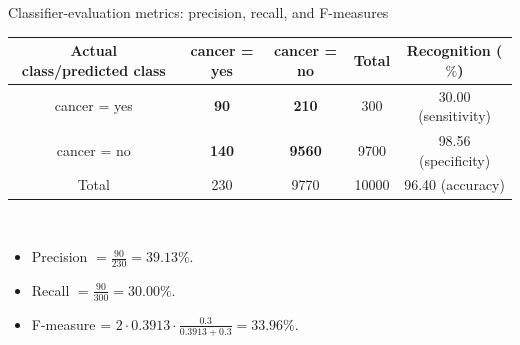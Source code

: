 \documentclass[aspectratio=169,t,table]{beamer}
\begin{document}
  {
    \begin{frame}{Classifier-evaluation metrics: precision, recall, and F-measures}
      \centering
      \begin{tabular}{|c|c|c|c|c|}
        \hline
        Actual class/predicted class & cancer = yes & cancer = no & Total & Recognition ($\%$) \\\hline
        cancer = yes & \textbf{90} & \textbf{210} & 300 & 30.00 (sensitivity) \\\hline
        cancer = no & \textbf{140} & \textbf{9560} & 9700 & 98.56 (specificity) \\\hline
        Total & 230 & 9770 & 10000 & 96.40 (accuracy) \\\hline
      \end{tabular}\\[0.2cm]
      \begin{itemize}
        \item Precision $= \frac{90}{230} = 39.13 \%$.
        \item Recall $=\frac{90}{300} = 30.00 \%$.
        \item F-measure = $2 \cdot 0.3913 \cdot \frac{0.3}{0.3913 + 0.3} = 33.96 \%$.
      \end{itemize}
    \end{frame}
  }
\end{document}
